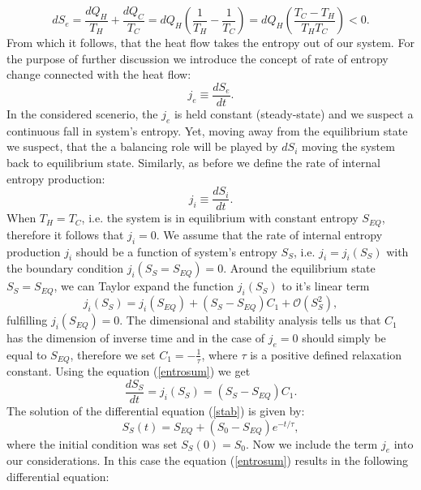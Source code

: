 \documentclass[a4paper,12pt]{article}
\begin{document}
\begin{equation}
dS_e=\frac{dQ_H}{T_H}+\frac{dQ_C}{T_C}=dQ_H\left(\frac{1}{T_H}-\frac{1}{T_C}\right)
=dQ_H\left(\frac{T_C-T_H}{T_HT_C}\right)<0.
\label{dSe1}
\end{equation}
From which it follows, that the heat flow takes the entropy out of our system.
For the purpose of further discussion we introduce the concept of rate of entropy change connected with the heat flow:
\begin{equation}
j_e \equiv  \frac{dS_e}{dt}. 
\end{equation}
In the considered scenerio, the $j_e$ is held constant (steady-state) and we suspect a continuous fall in system's entropy. Yet, moving away from the equilibrium state we suspect, that the a balancing role will be played by $dS_i$ moving the system back to equilibrium state. Similarly, as before we define the rate of internal entropy production:
\begin{equation}
j_i \equiv \frac{dS_i}{dt}.   
\end{equation} 
When $T_H=T_C$, i.e. the system is in equilibrium with constant entropy $S_{EQ}$, therefore it follows that $j_i=0$.
We assume that the rate of internal entropy production $j_i$ should be a function  of system's entropy $S_S$, i.e. $j_i = j_i(S_S)$ with the boundary condition $j_i(S_S=S_{EQ})=0$. Around the equilibrium state $S_S=S_{EQ}$, we can Taylor expand the function $j_i(S_S)$ to it's linear term
\begin{equation}
j_i(S_S)=j_i\left(S_{EQ}\right)+\left(S_S-S_{EQ}\right)C_1+\mathcal{O}\left(S_S^2\right),
\end{equation} 
fulfilling $j_i\left(S_{EQ}\right)=0$. The dimensional and stability analysis tells us that $C_1$ has the dimension of inverse time and in the case of 
$j_e=0$ should simply be equal to $S_{EQ}$, therefore we set $C_1 = -\frac{1}{\tau}$, where $\tau$ is a positive defined relaxation constant. Using the equation (\ref{entrosum}) we get
\begin{equation}
\label{stab}
\frac{dS_S}{dt}=j_i\left(S_S\right)=\left(S_S-S_{EQ}\right)C_1.
\end{equation} 
The solution of the differential equation (\ref{stab}) is given by:
\begin{equation}
S_S(t) =S_{EQ}+(S_0-S_{EQ})e^{-t/\tau}, 
\end{equation}
where the initial condition was set $S_S(0)=S_0$. Now we include the term $j_e$ into our considerations.
In this case the equation (\ref{entrosum}) results in the following differential equation:
\end{document}
